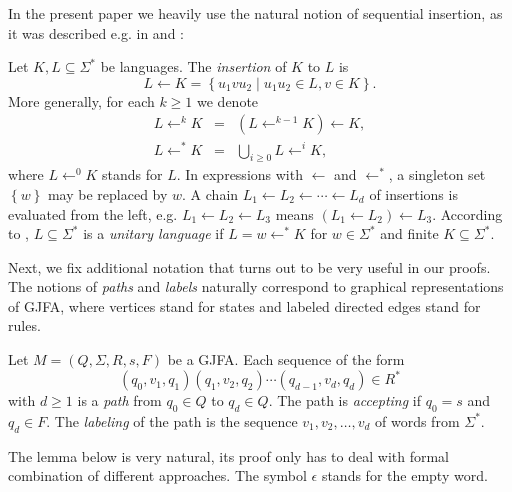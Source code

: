 \documentclass{ws-ijmpc}
\begin{document}
In the present paper we heavily use the natural notion of sequential
insertion, as it was described e.g. in \citep{reaHAU1} and \citep{athKAR2}:
\begin{definition}
Let $K,L\subseteq\Sigma^{*}$ be languages. The \emph{insertion }of
$K$ to $L$ is 
\[
L\leftarrow K=\left\{ u_{1}vu_{2}\mid u_{1}u_{2}\in L,v\in K\right\} .
\]
More generally, for each $k\ge1$ we denote
\begin{eqnarray*}
L\leftarrow^{k}K & = & \left(L\leftarrow^{k-1}K\right)\leftarrow K,\\
L\leftarrow^{*}K & = & \bigcup_{i\ge0}L\leftarrow^{i}K,
\end{eqnarray*}
where $L\leftarrow^{0}K$ stands for $L$. In expressions with $\leftarrow$
and $\leftarrow^{*}$, a singleton set $\left\{ w\right\} $ may be
replaced by $w$. A chain $L_{1}\leftarrow L_{2}\leftarrow\cdots\leftarrow L_{d}$
of insertions is evaluated from the left, e.g. $L_{1}\leftarrow L_{2}\leftarrow L_{3}$
means $\left(L_{1}\leftarrow L_{2}\right)\leftarrow L_{3}$. According
to \citep{reaEHR2}, $L\subseteq\Sigma^{*}$ is a\emph{ unitary language}
if $L=w\leftarrow^{*}K$ for $w\in\Sigma^{*}$ and finite $K\subseteq\Sigma^{*}$.
\end{definition}
Next, we fix additional notation that turns out to be very useful
in our proofs. The notions of \emph{paths }and \emph{labels }naturally
correspond to graphical representations of GJFA, where vertices stand
for states and labeled directed edges stand for rules.
\begin{definition}
\label{def: A-path}Let $M=\left(Q,\Sigma,R,s,F\right)$ be a GJFA.
Each sequence of the form 
\[
\left(q_{0},v_{1},q_{1}\right)\left(q_{1},v_{2},q_{2}\right)\cdots\left(q_{d-1},v_{d},q_{d}\right)\in R^{*}
\]
with $d\ge1$ is a \emph{path }from $q_{0}\in Q$ to $q_{d}\in Q$.
The path is \emph{accepting }if $q_{0}=s$ and $q_{d}\in F$. The
\emph{labeling }of the path is the sequence $v_{1},v_{2},\dots,v_{d}$
of words from $\Sigma^{*}$.
\end{definition}
The lemma below is very natural, its proof only has to deal with formal
combination of different approaches. The symbol $\epsilon$ stands
for the empty word.
\end{document}
